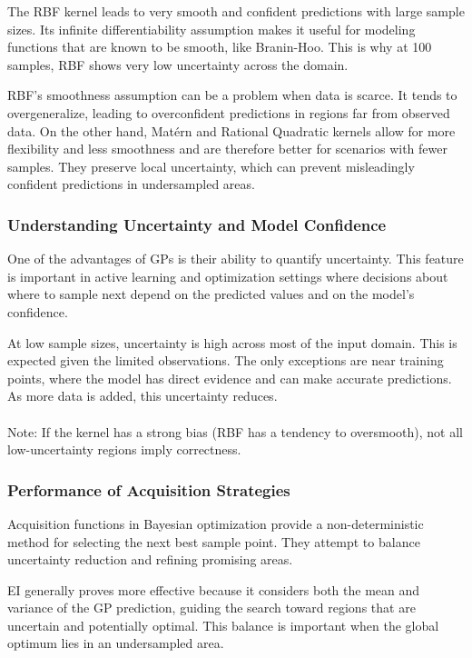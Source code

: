 \documentclass{article}
\begin{document}
The RBF kernel leads to very smooth and confident predictions with large sample sizes. Its infinite differentiability assumption makes it useful for modeling functions that are known to be smooth, like Branin-Hoo. This is why at 100 samples, RBF shows very low uncertainty across the domain.

RBF's smoothness assumption can be a problem when data is scarce. It tends to overgeneralize, leading to overconfident predictions in regions far from observed data. On the other hand, Matérn and Rational Quadratic kernels allow for more flexibility and less smoothness and are therefore better for scenarios with fewer samples. They preserve local uncertainty, which can prevent misleadingly confident predictions in undersampled areas.

\subsubsection{Understanding Uncertainty and Model Confidence}
One of the advantages of GPs is their ability to quantify uncertainty. This feature is important in active learning and optimization settings where decisions about where to sample next depend on the predicted values and on the model’s confidence.

At low sample sizes, uncertainty is high across most of the input domain. This is expected given the limited observations. The only exceptions are near training points, where the model has direct evidence and can make accurate predictions. As more data is added, this uncertainty reduces. \\ \\
Note: If the kernel has a strong bias (RBF has a tendency to oversmooth), not all low-uncertainty regions imply correctness.

\subsubsection{Performance of Acquisition Strategies}
Acquisition functions in Bayesian optimization provide a non-deterministic method for selecting the next best sample point. They attempt to balance uncertainty reduction and refining promising areas.

EI generally proves more effective because it considers both the mean and variance of the GP prediction, guiding the search toward regions that are uncertain and potentially optimal. This balance is important when the global optimum lies in an undersampled area.
\end{document}
